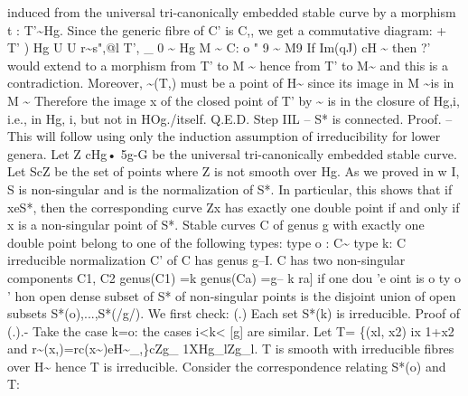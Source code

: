 \documentclass[11pt]{article}
\theoremstyle{plain}
\theoremstyle{definition}
\theoremstyle{remark}
\begin{document}
induced from the universal tri-canonically embedded stable curve by a morphism t : T'\textasciitilde{}Hg. Since the generic fibre of C' is C,, we get a commutative diagram: + T' ) Hg U U r\textasciitilde{}s",@l T', \_ 0 \textasciitilde{} Hg M \textasciitilde{} C: o " 9 \textasciitilde{} M9 If Im(qJ) cH \textasciitilde{} then ?' would extend to a morphism from T' to M \textasciitilde{} hence from T' to M\textasciitilde{} and this is a contradiction. Moreover, \textasciitilde{}(T,) must be a point of H\textasciitilde{} since its image in M \textasciitilde{}is in M \textasciitilde{} Therefore the image x of the closed point of T' by \textasciitilde{} is in the closure of Hg,i, i.e., in Hg, i, but not in HOg./itself. Q.E.D. Step IIL -- S* is connected. Proof. -- This will follow using only the induction assumption of irreducibility for lower genera. Let Z cHg• 5g-G be the universal tri-canonically embedded stable curve. Let ScZ be the set of points where Z is not smooth over Hg. As we proved in w I, S is non-singular and is the normalization of S*. In particular, this shows that if xeS*, then the corresponding curve Zx has exactly one double point if and only if x is a non-singular point of S*. Stable curves C of genus g with exactly one double point belong to one of the following types: type o : C\textasciitilde{} type k: C irreducible normalization C' of C has genus g--I. C has two non-singular components C1, C2 genus(C1) =k genus(Ca) =g-- k ra] if one dou 'e oint is o ty o ' hon open dense subset of S* of non-singular points is the disjoint union of open subsets S*(o),...,S*(/g/). We first check: (.) Each set S*(k) is irreducible. Proof of (.).- Take the case k=o: the cases i<k< [g] are similar. Let T= \{(xl, x2) ix 1+x2 and r\textasciitilde{}(x,)=rc(x\textasciitilde{})eH\textasciitilde{}\_,\}cZg\_ 1XHg\_lZg\_l. T is smooth with irreducible fibres over H\textasciitilde{} hence T is irreducible. Consider the correspondence relating S*(o) and T:
\end{document}

